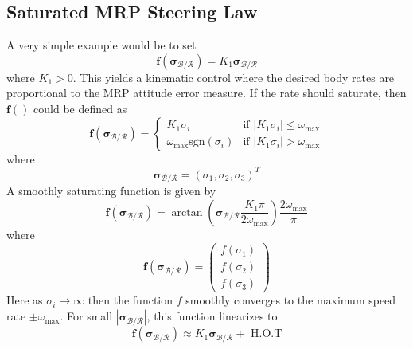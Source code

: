 \documentclass[]{BasiliskReportMemo}
\begin{document}
\subsection{Saturated  MRP Steering Law}
A very simple example would be to set
\begin{equation}
	\label{eq:MS:13}
	\bm f (\bm \sigma_{\mathcal{B}/\mathcal{R}}) =  K_{1} \bm \sigma_{\mathcal{B}/\mathcal{R}}
\end{equation}
where $K_{1}>0$.  
This yields a kinematic control where the desired body rates are proportional to the MRP attitude error measure.  If the rate should saturate, then $\bm f()$ could be defined as
\begin{equation}
	\label{eq:MS:14}
	\bm f(\bm \sigma_{\mathcal{B}/\mathcal{R}}) = \begin{cases}
		K_{1} \sigma_{i} 		&\text{if } |K_{1} \sigma_{i}| \le \omega_{\text{max}} \\
		\omega_{\text{max}} \text{sgn}(\sigma_{i}) &\text{if } |K_{1} \sigma_{i}| > \omega_{\text{max}}
	\end{cases}
\end{equation}
where
$$
	\bm\sigma_{\mathcal{B}/\mathcal{R}} = (\sigma_{1}, \sigma_{2}, \sigma_{3})^{T}
$$
A smoothly saturating function is given by
\begin{equation}
	\label{eq:MS:15}
	\bm f(\bm \sigma_{\mathcal{B}/\mathcal{R}}) = \arctan \left(
		\bm \sigma_{\mathcal{B}/\mathcal{R}} \frac{K_{1} \pi}{2  \omega_{\text{max}}}
	\right) \frac{2 \omega_{\text{max}}}{\pi}
\end{equation}
where
\begin{equation}
	\label{eq:MS:15.0}
	\bm f(\bm\sigma_{\mathcal{B}/\mathcal{R}}) = \begin{pmatrix}
		f(\sigma_{1})\\ f(\sigma_{2})\\ f(\sigma_{3})
		\end{pmatrix}
\end{equation}
Here as $\sigma_{i} \rightarrow \infty$ then the function $f$ smoothly converges to the maximum speed rate $\pm  \omega_{\text{max}}$.   For small $|\bm \sigma_{\mathcal{B}/\mathcal{R}}|$, this function linearizes to
\begin{equation}
	\bm f(\bm \sigma_{\mathcal{B}/\mathcal{R}}) \approx K_{1} \bm \sigma_{\mathcal{B}/\mathcal{R}} + \text{ H.O.T}
\end{equation}
\end{document}
